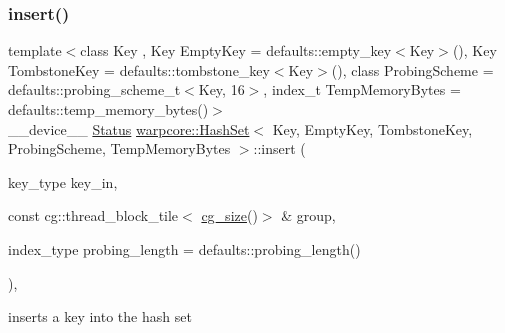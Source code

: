 \subsubsection{\texorpdfstring{insert()}{insert()}\hspace{0.1cm}{\footnotesize\ttfamily [1/2]}}
{\footnotesize\ttfamily template$<$class Key , Key Empty\+Key = defaults\+::empty\+\_\+key$<$\+Key$>$(), Key Tombstone\+Key = defaults\+::tombstone\+\_\+key$<$\+Key$>$(), class Probing\+Scheme  = defaults\+::probing\+\_\+scheme\+\_\+t$<$\+Key, 16$>$, index\+\_\+t Temp\+Memory\+Bytes = defaults\+::temp\+\_\+memory\+\_\+bytes()$>$ \\
\+\_\+\+\_\+device\+\_\+\+\_\+ \hyperlink{classwarpcore_1_1Status}{Status} \hyperlink{classwarpcore_1_1HashSet}{warpcore\+::\+Hash\+Set}$<$ Key, Empty\+Key, Tombstone\+Key, Probing\+Scheme, Temp\+Memory\+Bytes $>$\+::insert (\begin{DoxyParamCaption}\item[{key\+\_\+type}]{key\+\_\+in,  }\item[{const cg\+::thread\+\_\+block\+\_\+tile$<$ \hyperlink{classwarpcore_1_1HashSet_a0906259ae0be4a4f6f9ba74b4874e542}{cg\+\_\+size}()$>$ \&}]{group,  }\item[{index\+\_\+type}]{probing\+\_\+length = {\ttfamily defaults\+:\+:probing\+\_\+length()} }\end{DoxyParamCaption})\hspace{0.3cm}{\ttfamily [inline]}, {\ttfamily [noexcept]}}



inserts a key into the hash set 


